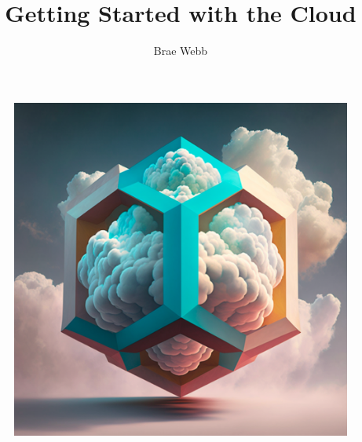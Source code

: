 \documentclass{csse4400}
\title{Getting Started with the Cloud}
\author{Brae Webb}
\date{\week[practical]{4}}
\begin{document}
\maketitle

\begin{figure}[h]
  \begin{center}
    \includegraphics[scale=0.4]{images/hextriscloud}
  \end{center}
\end{figure}

\end{document}
